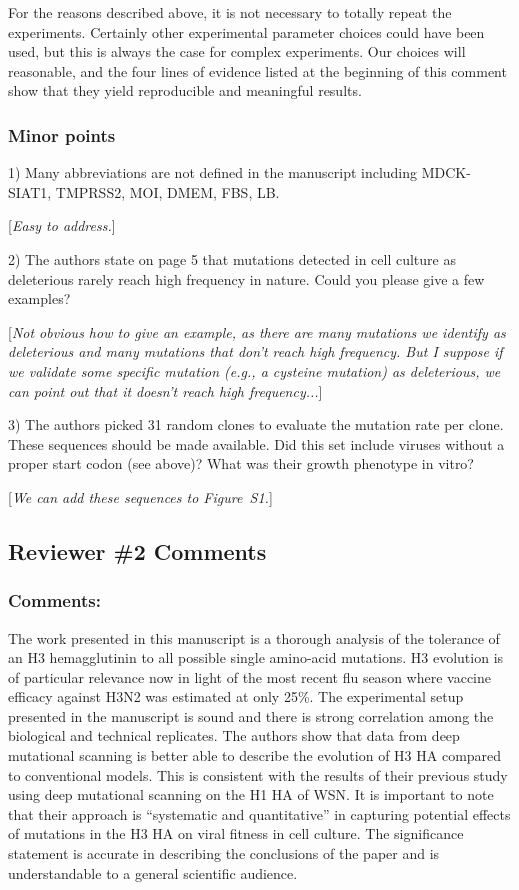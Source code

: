 \documentclass[11pt, oneside]{article}   	%
\newcommand{\comment}[1]{{\color{red}[\textsl{#1}]}}
\newcommand{\response}[1]{{\color{black}#1}}
\begin{document}
\response{For the reasons described above, it is not necessary to totally repeat the experiments.
Certainly other experimental parameter choices could have been used, but this is always the case for complex experiments.
Our choices will reasonable, and the four lines of evidence listed at the beginning of this comment show that they yield reproducible and meaningful results.}

\subsubsection*{Minor points} 

1) Many abbreviations are not defined in the manuscript including MDCK-SIAT1, TMPRSS2, MOI, DMEM, FBS, LB. 

\comment{Easy to address.}

2) The authors state on page 5 that mutations detected in cell culture as deleterious rarely reach high frequency in nature. Could you please give a few examples? 

\comment{Not obvious how to give an example, as there are many mutations we identify as deleterious and many mutations that don't reach high frequency. 
But I suppose if we validate some specific mutation (e.g., a cysteine mutation) as deleterious, we can point out that it doesn't reach high frequency...}

3) The authors picked 31 random clones to evaluate the mutation rate per clone. These sequences should be made available. Did this set include viruses without a proper start codon (see above)? What was their growth phenotype in vitro? 

\comment{We can add these sequences to Figure~S1.}

\subsection*{Reviewer \#2 Comments} 

\subsubsection*{Comments:} 
The work presented in this manuscript is a thorough analysis of the tolerance of an H3 hemagglutinin to all possible single amino-acid mutations. H3 evolution is of particular relevance now in light of the most recent flu season where vaccine efficacy against H3N2 was estimated at only 25\%. The experimental setup presented in the manuscript is sound and there is strong correlation among the biological and technical replicates. The authors show that data from deep mutational scanning is better able to describe the evolution of H3 HA compared to conventional models. This is consistent with the results of their previous study using deep mutational scanning on the H1 HA of WSN. It is important to note that their approach is ``systematic and quantitative'' in capturing potential effects of mutations in the H3 HA on viral fitness in cell culture. The significance statement is accurate in describing the conclusions of the paper and is understandable to a general scientific audience. 
\end{document}
